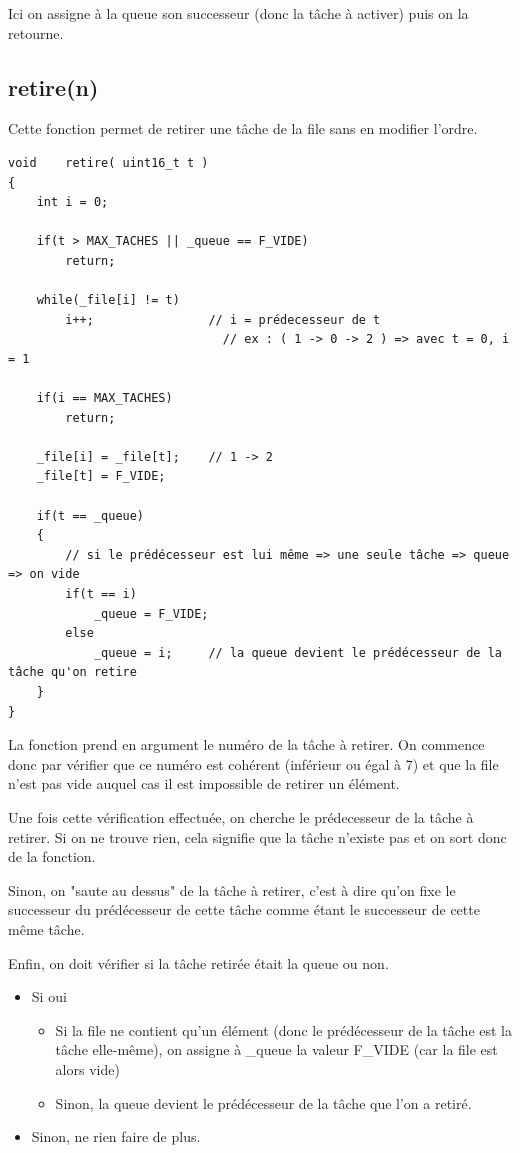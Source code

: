 \documentclass[a4paper,12pt]{report}
\begin{document}
Ici on assigne à la queue son successeur (donc la tâche à activer) puis on la retourne.


\subsection{retire(n)}
Cette fonction permet de retirer une tâche de la file sans en modifier l'ordre.
\begin{lstlisting}
void	retire( uint16_t t )
{
	int i = 0;

	if(t > MAX_TACHES || _queue == F_VIDE)
		return;

	while(_file[i] != t)
		i++;				// i = prédecesseur de t 
							  // ex : ( 1 -> 0 -> 2 ) => avec t = 0, i = 1

	if(i == MAX_TACHES)
		return;

	_file[i] = _file[t];	// 1 -> 2
	_file[t] = F_VIDE;
	
	if(t == _queue)
	{
		// si le prédécesseur est lui même => une seule tâche => queue => on vide
		if(t == i)			
			_queue = F_VIDE;
		else
			_queue = i;		// la queue devient le prédécesseur de la tâche qu'on retire
	}
}
\end{lstlisting}

La fonction prend en argument le numéro de la tâche à retirer. On commence donc par vérifier que ce numéro est cohérent (inférieur ou égal à 7) et que la file n'est pas vide auquel cas il est impossible de retirer un élément.\smallbreak

Une fois cette vérification effectuée, on cherche le prédecesseur de la tâche à retirer. Si on ne trouve rien, cela signifie que la tâche n'existe pas et on sort donc de la fonction.\smallbreak

Sinon, on "saute au dessus" de la tâche à retirer, c'est à dire qu'on fixe le successeur du prédécesseur de cette tâche comme étant le successeur de cette même tâche.\smallbreak

Enfin, on doit vérifier si la tâche retirée était la queue ou non.
\begin{itemize}
\item Si oui
	\begin{itemize}
	\item Si la file ne contient qu'un élément (donc le prédécesseur de la tâche est la tâche elle-même), on assigne à \_queue la valeur F\_VIDE (car la file est alors vide)
	\item Sinon, la queue devient le prédécesseur de la tâche que l'on a retiré.
	\end{itemize}
\item Sinon, ne rien faire de plus.
\end{itemize}
\end{document}

